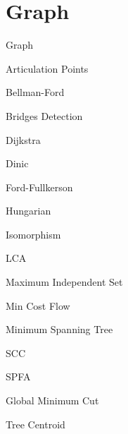 \section{Graph}

Graph


Articulation Points


Bellman-Ford


Bridges Detection


Dijkstra


Dinic


Ford-Fullkerson


Hungarian


Isomorphism


LCA


Maximum Independent Set


Min Cost Flow


Minimum Spanning Tree


SCC


SPFA


Global Minimum Cut


Tree Centroid

